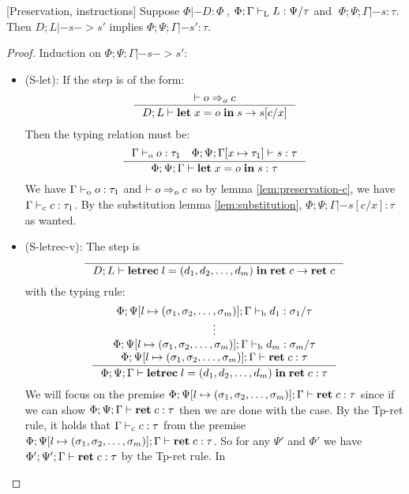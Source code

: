 \documentclass[a4paper, oneside, 10pt, draft]{memoir}
\begin{document}
\begin{lem}{[Preservation, instructions]}
  \label{lem:preservation-i}
  Suppose $\Phi |- D : \Phi \;$, $\Phi;\Gamma |-_{\mathrm{L}} L : \Psi / \tau$ and
  $\; \Phi;\Psi;\Gamma |- s : \tau$. Then $D;L |- s -> s'$ implies
  $\Phi;\Psi;\Gamma |- s' : \tau$.
\end{lem}
\begin{proof}
  Induction on $\Phi;\Psi;\Gamma |- s -> s'$:
  \begin{itemize}
  \item (S-let): If the step is of the form:
    \begin{equation*}
      \inference{|- o \eop c}{D;L |- \ilet{x}{o}{s} -> s[c/x]}
    \end{equation*}
    Then the typing relation must be:
    \begin{equation*}
    \inference{\Gamma \tpop o : \tau_1 \quad \Phi ; \Psi ;
      \Gamma[x \mapsto \tau_1] |- s : \tau}{\Phi ; \Psi ; \Gamma |-
      \ilet{x}{o}{s} : \tau}
    \end{equation*}
    We have $\Gamma |-_{\mathrm{o}} o : \tau_1$ and $|- o =>_{o} c$ so by lemma
    \ref{lem:preservation-c}, we have $\Gamma |-_{\mathrm{c}} c : \tau_1$. By the
    substitution lemma \ref{lem:substitution}, $\Phi;\Psi;\Gamma |-
    s[c/x] : \tau$ as wanted.
  \item (S-letrec-v):
    The step is
    \begin{equation*}
      \inference{}{D;L |- \iletrec{l}{\dbundle}
        {\iret{c}} -> \iret{c}}
    \end{equation*}
    with the typing rule:
    \begin{equation*}
    \inference{\Phi;\Psi[l \mapsto \bbtypes];\Gamma \tpb d_1 :
      \sigma_1 / \tau\\
      \vdots\\
      \Phi;\Psi[l \mapsto \bbtypes];\Gamma \tpb d_m : \sigma_m / \tau\\
      \Phi;\Psi[l \mapsto \bbtypes];\Gamma |- \iret{c} : \tau}
       {\Phi;\Psi;\Gamma |- \iletrec{l}{\dbundle}{\iret{c}} : \tau}
    \end{equation*}
    We will focus on the premise $\Phi;\Psi[l \mapsto (\sigma_1, \sigma_2, \dotsc, \sigma_m)];\Gamma
    |- \mathbf{ret} \; c : \tau$  since if we can show $\Phi;\Psi;\Gamma |-
    \mathbf{ret} \; c : \tau$ then we are done with the case. By the Tp-ret
    rule, it holds that $\Gamma |-_{\mathrm{c}} c : \tau$ from the premise $\Phi;\Psi[l \mapsto (\sigma_1, \sigma_2, \dotsc, \sigma_m)];\Gamma
    |- \mathbf{ret} \; c : \tau$. So for any $\Psi'$ and $\Phi'$ we have
    $\Phi';\Psi';\Gamma |- \mathbf{ret} \; c : \tau$ by the Tp-ret rule. In

\end{itemize}
\end{proof}
\end{document}
